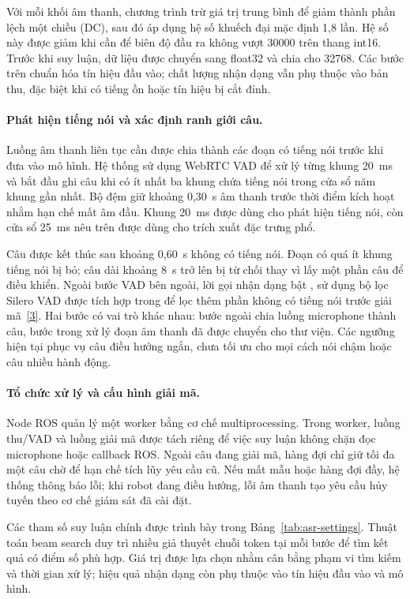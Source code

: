 \documentclass[13pt,a4paper]{extarticle}
\newcommand{\code}[1]{%
    \path{#1}%
}
\begin{document}
Với mỗi khối âm thanh, chương trình trừ giá trị trung bình để giảm thành phần lệch một chiều (DC), sau đó áp dụng hệ số khuếch đại mặc định 1,8 lần. Hệ số này được giảm khi cần để biên độ đầu ra không vượt 30000 trên thang int16. Trước khi suy luận, dữ liệu được chuyển sang float32 và chia cho 32768. Các bước trên chuẩn hóa tín hiệu đầu vào; chất lượng nhận dạng vẫn phụ thuộc vào bản thu, đặc biệt khi có tiếng ồn hoặc tín hiệu bị cắt đỉnh.

\paragraph{Phát hiện tiếng nói và xác định ranh giới câu.}
Luồng âm thanh liên tục cần được chia thành các đoạn có tiếng nói trước khi đưa vào mô hình. Hệ thống sử dụng WebRTC VAD để xử lý từng khung 20~ms và bắt đầu ghi câu khi có ít nhất ba khung chứa tiếng nói trong cửa sổ năm khung gần nhất. Bộ đệm giữ khoảng 0,30~s âm thanh trước thời điểm kích hoạt nhằm hạn chế mất âm đầu. Khung 20~ms được dùng cho phát hiện tiếng nói, còn cửa sổ 25~ms nêu trên được dùng cho trích xuất đặc trưng phổ.

Câu được kết thúc sau khoảng 0,60~s không có tiếng nói. Đoạn có quá ít khung tiếng nói bị bỏ; câu dài khoảng 8~s trở lên bị từ chối thay vì lấy một phần câu để điều khiển. Ngoài bước VAD bên ngoài, lời gọi nhận dạng bật \code{vad_filter=True}, sử dụng bộ lọc Silero VAD được tích hợp trong \code{faster-whisper} để lọc thêm phần không có tiếng nói trước giải mã~\hyperref[ref:fasterwhisper]{[3]}. Hai bước có vai trò khác nhau: bước ngoài chia luồng microphone thành câu, bước trong xử lý đoạn âm thanh đã được chuyển cho thư viện. Các ngưỡng hiện tại phục vụ câu điều hướng ngắn, chưa tối ưu cho mọi cách nói chậm hoặc câu nhiều hành động.

\paragraph{Tổ chức xử lý và cấu hình giải mã.}
Node ROS \code{speech_node} quản lý một worker bằng cơ chế multiprocessing. Trong worker, luồng thu/VAD và luồng giải mã được tách riêng để việc suy luận không chặn đọc microphone hoặc callback ROS. Ngoài câu đang giải mã, hàng đợi chỉ giữ tối đa một câu chờ để hạn chế tích lũy yêu cầu cũ. Nếu mất mẫu hoặc hàng đợi đầy, hệ thống thông báo lỗi; khi robot đang điều hướng, lỗi âm thanh tạo yêu cầu hủy tuyến theo cơ chế giám sát đã cài đặt.

Các tham số suy luận chính được trình bày trong Bảng~\ref{tab:asr-settings}. Thuật toán beam search duy trì nhiều giả thuyết chuỗi token tại mỗi bước để tìm kết quả có điểm số phù hợp. Giá trị \code{beam_size=5} được lựa chọn nhằm cân bằng phạm vi tìm kiếm và thời gian xử lý; hiệu quả nhận dạng còn phụ thuộc vào tín hiệu đầu vào và mô hình.
\end{document}
